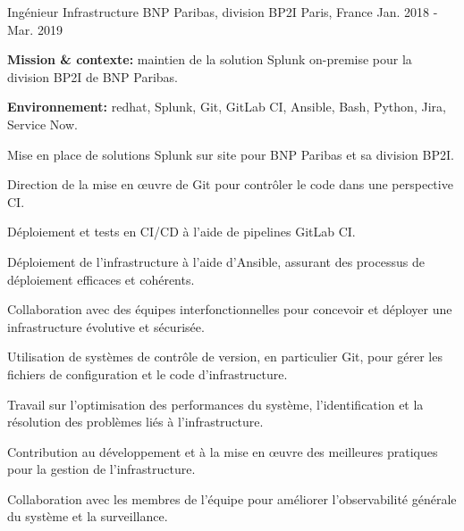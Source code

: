 \begin{cventries}
\cventry
{Ingénieur Infrastructure} %
{BNP Paribas, division BP2I} %
{Paris, France} %
{Jan. 2018 - Mar. 2019} %
{
  \begin{cvitems} %
    \item {\textbf{Mission \& contexte:} maintien de la solution  Splunk on-premise pour la division BP2I de BNP Paribas.}
    \item {\textbf{Environnement:} redhat, Splunk, Git, GitLab CI, Ansible, Bash, Python, Jira, Service Now.}
    \item {Mise en place de solutions Splunk sur site pour BNP Paribas et sa division BP2I.}
    \item {Direction de la mise en œuvre de Git pour contrôler le code dans une perspective CI.}
    \item {Déploiement et tests en CI/CD à l'aide de pipelines GitLab CI.}
    \item {Déploiement de l'infrastructure à l'aide d'Ansible, assurant des processus de déploiement efficaces et cohérents.}
    \item {Collaboration avec des équipes interfonctionnelles pour concevoir et déployer une infrastructure évolutive et sécurisée.}
    \item {Utilisation de systèmes de contrôle de version, en particulier Git, pour gérer les fichiers de configuration et le code d'infrastructure.}
    \item {Travail sur l'optimisation des performances du système, l'identification et la résolution des problèmes liés à l'infrastructure.}
    \item {Contribution au développement et à la mise en œuvre des meilleures pratiques pour la gestion de l'infrastructure.}
    \item {Collaboration avec les membres de l'équipe pour améliorer l'observabilité générale du système et la surveillance.}
  \end{cvitems}
}


\end{cventries}
